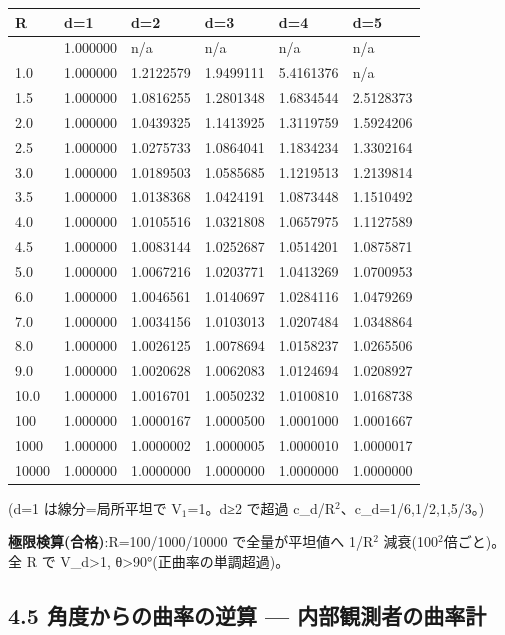 \documentclass[
]{ltjsarticle}
\newcounter{none} %
\begin{document}
{\def\LTcaptype{none} %
\begin{longtable}[]{@{}llllll@{}}
\toprule\noalign{}
R & d=1 & d=2 & d=3 & d=4 & d=5 \\
\midrule\noalign{}
\endhead
\bottomrule\noalign{}
\endlastfoot
0.5 & 1.000000 & n/a & n/a & n/a & n/a \\
1.0 & 1.000000 & 1.2122579 & 1.9499111 & 5.4161376 & n/a \\
1.5 & 1.000000 & 1.0816255 & 1.2801348 & 1.6834544 & 2.5128373 \\
2.0 & 1.000000 & 1.0439325 & 1.1413925 & 1.3119759 & 1.5924206 \\
2.5 & 1.000000 & 1.0275733 & 1.0864041 & 1.1834234 & 1.3302164 \\
3.0 & 1.000000 & 1.0189503 & 1.0585685 & 1.1219513 & 1.2139814 \\
3.5 & 1.000000 & 1.0138368 & 1.0424191 & 1.0873448 & 1.1510492 \\
4.0 & 1.000000 & 1.0105516 & 1.0321808 & 1.0657975 & 1.1127589 \\
4.5 & 1.000000 & 1.0083144 & 1.0252687 & 1.0514201 & 1.0875871 \\
5.0 & 1.000000 & 1.0067216 & 1.0203771 & 1.0413269 & 1.0700953 \\
6.0 & 1.000000 & 1.0046561 & 1.0140697 & 1.0284116 & 1.0479269 \\
7.0 & 1.000000 & 1.0034156 & 1.0103013 & 1.0207484 & 1.0348864 \\
8.0 & 1.000000 & 1.0026125 & 1.0078694 & 1.0158237 & 1.0265506 \\
9.0 & 1.000000 & 1.0020628 & 1.0062083 & 1.0124694 & 1.0208927 \\
10.0 & 1.000000 & 1.0016701 & 1.0050232 & 1.0100810 & 1.0168738 \\
100 & 1.000000 & 1.0000167 & 1.0000500 & 1.0001000 & 1.0001667 \\
1000 & 1.000000 & 1.0000002 & 1.0000005 & 1.0000010 & 1.0000017 \\
10000 & 1.000000 & 1.0000000 & 1.0000000 & 1.0000000 & 1.0000000 \\
\end{longtable}
}

(d=1 は線分=局所平坦で V\(_{1}\)=1。d≥2 で超過
c\_d/R\(^{2}\)、c\_d=1/6,1/2,1,5/3。)

\textbf{極限検算(合格)}:R=100/1000/10000 で全量が平坦値へ 1/R\(^{2}\)
減衰(100\(^{2}\)倍ごと)。全 R で V\_d\textgreater1,
θ\textgreater90°(正曲率の単調超過)。

\subsection{4.5 角度からの曲率の逆算 ---
内部観測者の曲率計}\label{ux89d2ux5ea6ux304bux3089ux306eux66f2ux7387ux306eux9006ux7b97-ux5185ux90e8ux89b3ux6e2cux8005ux306eux66f2ux7387ux8a08}
\end{document}
